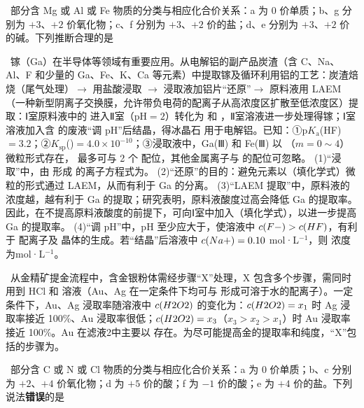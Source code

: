\begin{xiti}
\item {}\ 部分含 Mg 或 Al 或 Fe 物质的分类与相应化合价关系：a 为 0 价单质；b、g 分别为 $+3$、$+2$ 价氧化物；c、f 分别为 $+3$、$+2$ 价的盐；d、e 分别为 $+3$、$+2$ 价的碱。下列推断合理的是\xz
{}

\item {}\ 镓（Ga）在半导体等领域有重要应用。从电解铝的副产品炭渣（含 C、Na、Al、F 和少量的 Ga、Fe、K、Ca 等元素）中提取镓及循环利用铝的工艺：炭渣焙烧（尾气处理）$\to$ 用盐酸浸取 $\to$ 浸取液加铝片“还原”$\to$ 原料液用 LAEM（一种新型阴离子交换膜，允许带负电荷的配离子从高浓度区扩散至低浓度区）提取：Ⅰ室原料液中的 \ce{[GaCl4]-} 进入Ⅱ室（pH$=2$）转化为  和 ，Ⅱ室溶液进一步处理得镓；Ⅰ室溶液加入含  的废液“调 pH”后结晶，得冰晶石  用于电解铝。已知：①p$K_\text{a}$(HF)$=3.2$；②$K_\text{sp}$()$=4.0\times10^{-10}$；③浸取液中，Ga(Ⅲ) 和 Fe(Ⅲ) 以 （$m=0\sim4$）微粒形式存在， 最多可与 2 个  配位，其他金属离子与  的配位可忽略。
(1)“浸取”中，由  形成 \ce{[GaCl4]-} 的离子方程式为\tk。
(2)“还原”的目的：避免\tk{}元素以\tk（填化学式）微粒的形式通过 LAEM，从而有利于 Ga 的分离。
(3)“LAEM 提取”中，原料液的  浓度越\tk，越有利于 Ga 的提取；研究表明，原料液酸度过高会降低 Ga 的提取率。因此，在不提高原料液酸度的前提下，可向Ⅰ室中加入\tk（填化学式），以进一步提高 Ga 的提取率。
(4)“调 pH”中，pH 至少应大于\tk，使溶液中 $c(F-)>c(HF)$，有利于  配离子及  晶体的生成。若“结晶”后溶液中 $c(Na+)=0.10$ mol·L$^{-1}$，则  浓度为\tk mol·L$^{-1}$。

\item {}\ 从金精矿提金流程中，含金银粉体需经步骤“X”处理，X 包含多个步骤，需同时用到 HCl 和  溶液（Au、Ag 在一定条件下均可与  形成可溶于水的配离子）。一定条件下，Au、Ag 浸取率随溶液中 $c(H2O2)$ 的变化为：$c(H2O2)=x_1$ 时 Ag 浸取率接近 100\%、Au 浸取率很低；$c(H2O2)=x_3$（$x_3>x_2>x_1$）时 Au 浸取率接近 100\%。Au 在滤液2中主要以 \ce{[AuCl4]-} 存在。为尽可能提高金的提取率和纯度，“X”包括的步骤为\tk。

\item {}\ 部分含 C 或 N 或 Cl 物质的分类与相应化合价关系：a 为 0 价单质；b、c 分别为 $+2$、$+4$ 价氧化物；d 为 $+5$ 价的酸；f 为 $-1$ 价的酸；e 为 $+4$ 价的盐。下列说法\textbf{错误}的是\xz
{}


\end{xiti}
